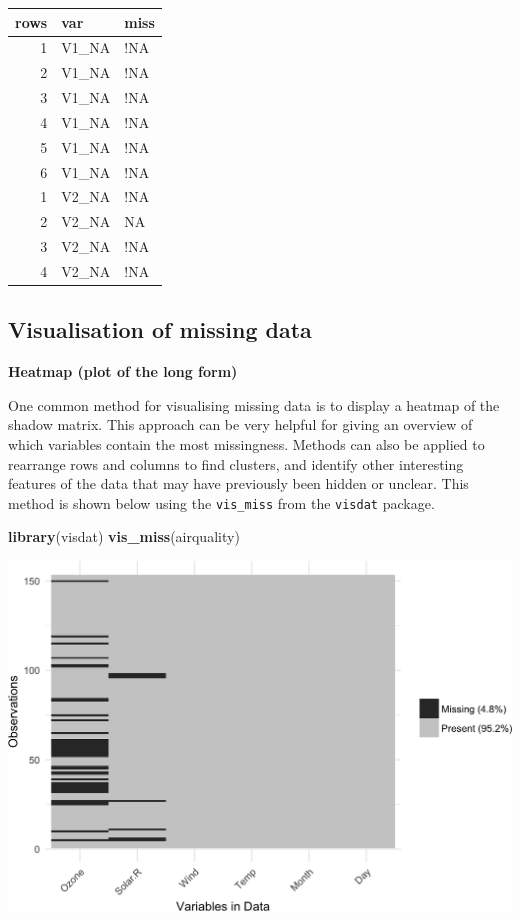 \documentclass[]{article}
\newenvironment{Shaded}{\begin{snugshade}}{\end{snugshade}}
\newcommand{\KeywordTok}[1]{\textcolor[rgb]{0.13,0.29,0.53}{\textbf{{#1}}}}
\newcommand{\NormalTok}[1]{{#1}}
\begin{document}
\begin{longtable}[]{@{}rll@{}}
\toprule
rows & var & miss\tabularnewline
\midrule
\endhead
1 & V1\_NA & !NA\tabularnewline
2 & V1\_NA & !NA\tabularnewline
3 & V1\_NA & !NA\tabularnewline
4 & V1\_NA & !NA\tabularnewline
5 & V1\_NA & !NA\tabularnewline
6 & V1\_NA & !NA\tabularnewline
1 & V2\_NA & !NA\tabularnewline
2 & V2\_NA & NA\tabularnewline
3 & V2\_NA & !NA\tabularnewline
4 & V2\_NA & !NA\tabularnewline
\bottomrule
\end{longtable}

\subsection{Visualisation of missing
data}\label{visualisation-of-missing-data}

\textbf{Heatmap (plot of the long form)}

One common method for visualising missing data is to display a heatmap
of the shadow matrix. This approach can be very helpful for giving an
overview of which variables contain the most missingness. Methods can
also be applied to rearrange rows and columns to find clusters, and
identify other interesting features of the data that may have previously
been hidden or unclear. This method is shown below using the
\texttt{vis\_miss} from the \texttt{visdat} package.

\begin{Shaded}
\begin{Highlighting}[]
\KeywordTok{library}\NormalTok{(visdat)}
\KeywordTok{vis_miss}\NormalTok{(airquality)}
\end{Highlighting}
\end{Shaded}

\includegraphics{jsm2017_files/figure-latex/unnamed-chunk-1-1.png}
\end{document}

